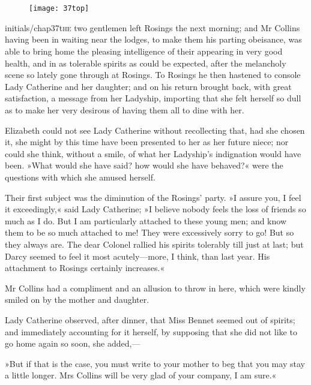\chapter[Chapter \thechapter]{}
	
\begin{figure}[t!]
\centering
\texttt{[image: 37top]}
\end{figure}


\lettrine[lines=6,image=true]{initials/chap37t}{he} two gentlemen left Rosings the next morning; and Mr Collins having been in waiting near the lodges, to make them his parting obeisance, was able to bring home the pleasing intelligence of their appearing in very good health, and in as tolerable spirits as could be expected, after the melancholy scene so lately gone through at Rosings. To Rosings he then hastened to console Lady Catherine and her daughter; and on his return brought back, with great satisfaction, a message from her Ladyship, importing that she felt herself so dull as to make her very desirous of having them all to dine with her.

Elizabeth could not see Lady Catherine without recollecting that, had she chosen it, she might by this time have been presented to her as her future niece; nor could she think, without a smile, of what her Ladyship's indignation would have been. »What would she have said? how would she have behaved?« were the questions with which she amused herself.

Their first subject was the diminution of the Rosings' party. »I assure you, I feel it exceedingly,« said Lady Catherine; »I believe nobody feels the loss of friends so much as I do. But I am particularly attached to these young men; and know them to be so much attached to me! They were excessively sorry to go! But so they always are. The dear Colonel rallied his spirits tolerably till just at last; but Darcy seemed to feel it most acutely—more, I think, than last year. His attachment to Rosings certainly increases.«

Mr Collins had a compliment and an allusion to throw in here, which were kindly smiled on by the mother and daughter.

Lady Catherine observed, after dinner, that Miss Bennet seemed out of spirits; and immediately accounting for it herself, by supposing that she did not like to go home again so soon, she added,—

»But if that is the case, you must write to your mother to beg that you may stay a little longer. Mrs Collins will be very glad of your company, I am sure.«

